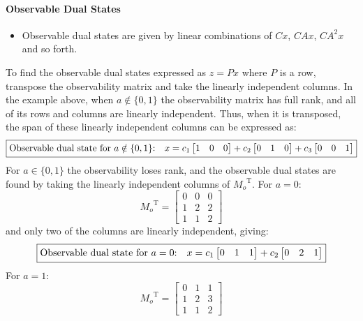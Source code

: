 \paragraph{Observable Dual States}
\begin{itemize}
  \item{Observable dual states are given by linear combinations of $Cx$, $CAx$, $CA^{2}x$ and so forth.}
\end{itemize}
To find the observable dual states expressed as $z=Px$ where $P$ is a row, transpose the observability matrix and take the linearly independent columns.
In the example above, when $a\notin\{0,1\}$ the observability matrix has full rank, and all of its rows and columns are linearly independent.
Thus, when it is transposed, the span of these linearly independent columns can be expressed as:
\begin{equation*}
  \boxed{%
    \text{Observable dual state for $a\notin\{0,1\}$:}\quad
    x=c_{1}
    \begin{bmatrix}
      1 & 0 & 0
    \end{bmatrix}+
    c_{2}
    \begin{bmatrix}
      0 & 1 & 0
    \end{bmatrix}+
    c_{3}
    \begin{bmatrix}
      0 & 0 & 1
    \end{bmatrix}
  }
\end{equation*}
For $a\in\{0,1\}$ the observability loses rank, and the observable dual states are found by taking the linearly independent columns of ${M_{o}}^{\text{T}}$.
For $a=0$:
\begin{equation*}
  {M_{o}}^{\text{T}}=
  \begin{bmatrix}
    0 & 0 & 0 \\
    1 & 2 & 2 \\
    1 & 1 & 2
  \end{bmatrix}
\end{equation*}
and only two of the columns are linearly independent, giving:
\begin{equation*}
  \boxed{%
    \text{Observable dual state for $a=0$:}\quad
    x=c_{1}
    \begin{bmatrix}
      0 & 1 & 1
    \end{bmatrix}+
    c_{2}
    \begin{bmatrix}
      0 & 2 & 1
    \end{bmatrix}
  }
\end{equation*}
For $a=1$:
\begin{equation*}
  {M_{o}}^{\text{T}}=
  \begin{bmatrix}
    0 & 1 & 1 \\
    1 & 2 & 3 \\
    1 & 1 & 2
  \end{bmatrix}
\end{equation*}
